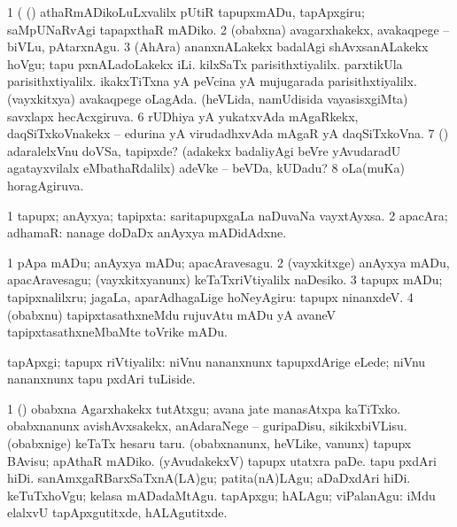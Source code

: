 \noindent
\gl{\pagu}
\expl{}
\bmng
\bnum
\num{1}  (  (\rUpa) athaRmADikoLuLxvalilx pUtiR tapupxmADu, tapApxgiru; saMpUNaRvAgi tapapxthaR mADiko. 
\num{2}  (obabxna) avagarxhakekx, avakaqpege -- biVLu, pAtarxnAgu. 
\num{3}  (AhAra) ananxnALakekx badalAgi shAvxsanALakekx hoVgu; tapu pxnALadoLakekx iLi. 
  
\banum
{} kilxSaTx parisithxtiyalilx. 
 parxtikUla parisithxtiyalilx. 
 ikakxTiTxna yA peVcina yA mujugarada parisithxtiyalilx. 
\eanum
\numie
{}  
\banum
{} (vayxkitxya) avakaqpege oLagAda. 
 (heVLida, namUdisida vayasisxgiMta) savxlapx hecAcxgiruva. 
\eanum
\numie
\num{6}  rUDhiya yA yukatxvAda mAgaRkekx, daqSiTxkoVnakekx -- edurina yA virudadhxvAda mAgaR yA daqSiTxkoVna. 
\num{7}  (\AmA) adaralelxVnu doVSa, tapipxde? (adakekx badaliyAgi beVre yAvudaradU agatayxvilalx eMbathaRdalilx) adeVke -- beVDa, kUDadu? 
\num{8}  oLa(muKa) horagAgiruva. 
\enum
\emng
\eentry

\bentry
{} 
\gl{\nA}
\expl{}
\bmng
\bnum
\num{1} tapupx; anAyxya; tapipxta:  saritapupxgaLa naDuvaNa vayxtAyxsa. 
\num{2} apacAra; adhamaR:  nanage doDaDx anAyxya mADidAdxne. 
\enum
\emng

\noindent
\gl{\pagu}
\expl{}
\bmng
\bnum
\num{1}  pApa mADu; anAyxya mADu; apacAravesagu. 
\num{2}  (vayxkitxge) anAyxya mADu, apacAravesagu; (vayxkitxyanunx) keTaTxriVtiyalilx naDesiko. 
\num{3}  tapupx mADu; tapipxnalilxru; jagaLa, aparAdhagaLige hoNeyAgiru:  tapupx ninanxdeV. 
\num{4}  (obabxnu) tapipxtasathxneMdu rujuvAtu mADu yA avaneV tapipxtasathxneMbaMte toVrike mADu. 
\enum
\emng
\eentry

\bentry
{} 
\gl{\kirxvi}
\expl{}
\bmng
tapApxgi; tapupx riVtiyalilx:  niVnu nananxnunx tapupxdArige eLede; niVnu nananxnunx tapu pxdAri tuLiside. 
\emng

\noindent
\gl{\pagu}
\expl{}
\bmng
\bnum
\num{1}  (\AmA) obabxna Agarxhakekx tutAtxgu; avana jate manasAtxpa kaTiTxko. 
  
\banum
{} obabxnanunx avishAvxsakekx, anAdaraNege -- guripaDisu, sikikxbiVLisu. 
 (obabxnige) keTaTx hesaru taru. 
\eanum
\numie
{}  
\banum
{} (obabxnanunx, heVLike, \mo vanunx) tapupx BAvisu; apAthaR mADiko. 
 (yAvudakekxV) tapupx utatxra paDe. 
\eanum
\numie
{}  
\banum
{} tapu pxdAri hiDi. 
 sanAmxgaRBarxSaTxnA(LA)gu; patita(nA)LAgu; aDaDxdAri hiDi. 
 keTuTxhoVgu; kelasa mADadaMtAgu. 
 tapApxgu; hALAgu; viPalanAgu:  iMdu elalxvU tapApxgutitxde, hALAgutitxde. 
\eanum
\numie
\enum
\emng
\eentry

